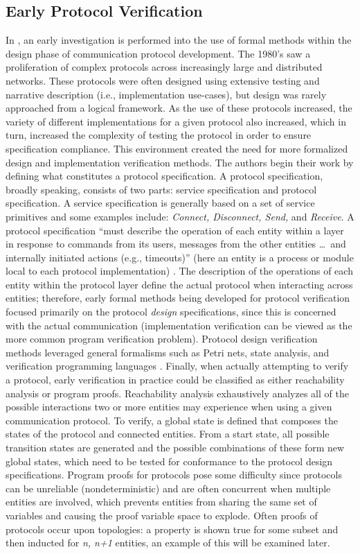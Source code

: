 \documentclass[10pt, journal]{IEEEtran}
\begin{document}
\subsection{Early Protocol Verification}
In \cite{Bochman1980}, an early investigation is performed into the use of formal methods within the design phase of communication protocol development. The 1980's saw a proliferation of complex protocols across increasingly large and distributed networks. These protocols were often designed using extensive testing and narrative description (i.e., implementation use-cases), but design was rarely approached from a logical framework. As the use of these protocols increased, the variety of different implementations for a given protocol also increased, which in turn, increased the complexity of testing the protocol in order to ensure specification compliance. This environment created the need for more formalized design and implementation verification methods. 
\bigbreak
The authors begin their work by defining what constitutes a protocol specification. A protocol specification, broadly speaking, consists of two parts: service specification and protocol specification. A service specification is generally based on a set of service primitives and some examples include: \textit{Connect, Disconnect, Send,} and \textit{Receive}. A protocol specification ``must describe the operation of each entity within a layer in response to commands from its users, messages from the other entities \ldots\ and internally initiated actions (e.g., timeouts)'' (here an entity is a process or module local to each protocol implementation) \cite{Bochman1980}. The description of the operations of each entity within the protocol layer define the actual protocol when interacting across entities; therefore, early formal methods being developed for protocol verification focused primarily on the protocol \textit{design} specifications, since this is concerned with the actual communication (implementation verification can be viewed as the more common program verification problem). Protocol design verification methods leveraged general formalisms such as Petri nets, state analysis, and verification programming languages \cite{Petri1966}. 
\bigbreak
Finally, when actually attempting to verify a protocol, early verification in practice could be classified as either reachability analysis or program proofs. Reachability analysis exhaustively analyzes all of the possible interactions two or more entities may experience when using a given communication protocol. To verify, a global state is defined that composes the states of the protocol and connected entities. From a start state, all possible transition states are generated and the possible combinations of these form new global states, which need to be tested for conformance to the protocol design specifications. Program proofs for protocols pose some difficulty since protocols can be unreliable (nondeterministic) and are often concurrent when multiple entities are involved, which prevents entities from sharing the same set of variables and causing the proof variable space to explode. Often proofs of protocols occur upon topologies: a property is shown true for some subset and then inducted for \textit{n, n+1} entities, an example of this will be examined later. 
\end{document}
